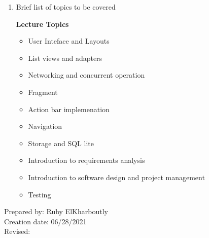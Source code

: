 \begin{enumerate}[1.]
\item Brief list of topics to be covered\\
  {\bfseries
    Lecture Topics
    \begin{itemize}
      \item User Inteface and Layouts
      \item List views and adapters
	  \item Networking and concurrent operation
	  \item Fragment
	  \item Action bar implemenation
	  \item Navigation
	  \item Storage and SQL lite
	  \item Introduction to requirements analysis
	  \item Introduction to software design and project management
	  \item Testing
    \end{itemize}
  }

\end{enumerate}

\noindent Prepared by: Ruby ElKharboutly\\
\noindent Creation date: 06/28/2021\\
\noindent Revised:\\
